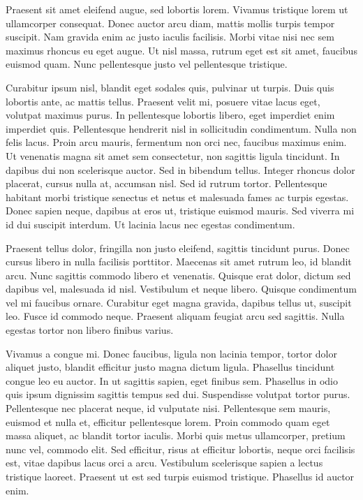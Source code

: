 \documentclass[10pt]{article}
\begin{document}
	Praesent sit amet eleifend augue, sed lobortis lorem. Vivamus tristique lorem ut ullamcorper consequat. Donec auctor arcu diam, mattis mollis turpis tempor suscipit. Nam gravida enim ac justo iaculis facilisis. Morbi vitae nisi nec sem maximus rhoncus eu eget augue. Ut nisl massa, rutrum eget est sit amet, faucibus euismod quam. Nunc pellentesque justo vel pellentesque tristique.
	
	Curabitur ipsum nisl, blandit eget sodales quis, pulvinar ut turpis. Duis quis lobortis ante, ac mattis tellus. Praesent velit mi, posuere vitae lacus eget, volutpat maximus purus. In pellentesque lobortis libero, eget imperdiet enim imperdiet quis. Pellentesque hendrerit nisl in sollicitudin condimentum. Nulla non felis lacus. Proin arcu mauris, fermentum non orci nec, faucibus maximus enim. Ut venenatis magna sit amet sem consectetur, non sagittis ligula tincidunt. In dapibus dui non scelerisque auctor. Sed in bibendum tellus. Integer rhoncus dolor placerat, cursus nulla at, accumsan nisl. Sed id rutrum tortor. Pellentesque habitant morbi tristique senectus et netus et malesuada fames ac turpis egestas. Donec sapien neque, dapibus at eros ut, tristique euismod mauris. Sed viverra mi id dui suscipit interdum. Ut lacinia lacus nec egestas condimentum.
	
	Praesent tellus dolor, fringilla non justo eleifend, sagittis tincidunt purus. Donec cursus libero in nulla facilisis porttitor. Maecenas sit amet rutrum leo, id blandit arcu. Nunc sagittis commodo libero et venenatis. Quisque erat dolor, dictum sed dapibus vel, malesuada id nisl. Vestibulum et neque libero. Quisque condimentum vel mi faucibus ornare. Curabitur eget magna gravida, dapibus tellus ut, suscipit leo. Fusce id commodo neque. Praesent aliquam feugiat arcu sed sagittis. Nulla egestas tortor non libero finibus varius.
	
	Vivamus a congue mi. Donec faucibus, ligula non lacinia tempor, tortor dolor aliquet justo, blandit efficitur justo magna dictum ligula. Phasellus tincidunt congue leo eu auctor. In ut sagittis sapien, eget finibus sem. Phasellus in odio quis ipsum dignissim sagittis tempus sed dui. Suspendisse volutpat tortor purus. Pellentesque nec placerat neque, id vulputate nisi. Pellentesque sem mauris, euismod et nulla et, efficitur pellentesque lorem. Proin commodo quam eget massa aliquet, ac blandit tortor iaculis. Morbi quis metus ullamcorper, pretium nunc vel, commodo elit. Sed efficitur, risus at efficitur lobortis, neque orci facilisis est, vitae dapibus lacus orci a arcu. Vestibulum scelerisque sapien a lectus tristique laoreet. Praesent ut est sed turpis euismod tristique. Phasellus id auctor enim.
	
\end{document}
